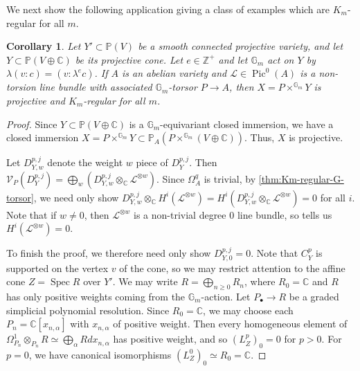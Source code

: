 \documentclass{amsart}
\newtheorem{corollary}[corollary]{Corollary}
\theoremstyle{definition}
\newcommand{\ZZ}{\mathbb{Z}}
\newcommand{\CC}{\mathbb{C}}
\newcommand{\bG}{\mathbb{G}}
\newcommand{\bP}{\mathbb{P}}
\newcommand{\cV}{\mathcal{V}}
\newcommand{\cL}{\mathcal{L}}
\DeclareMathOperator{\Pic}{Pic}
\DeclareMathOperator{\Spec}{Spec}
\begin{document}
We next show the following application giving a class of examples which are $K_m$-regular for all $m$.

\begin{corollary}\label{cor:Km-regular-cone}
    Let $Y'\subset\bP(V)$ be a smooth connected projective variety, and let $Y\subset\bP(V\oplus\CC)$ be its projective cone. Let $e\in\ZZ^+$ and let $\bG_m$ act on $Y$ by $\lambda(v:c)=(v:\lambda^e c)$. If $A$ is an abelian variety and $\cL\in\Pic^0(A)$ is a non-torsion line bundle with associated $\bG_m$-torsor $P\to A$, then $X=P\times^{\bG_m}Y$ is projective and $K_m$-regular for all $m$.
\end{corollary}

\begin{proof}
    Since $Y\subset\bP(V\oplus\CC)$ is a $\bG_m$-equivariant closed immersion, we have a closed immersion $X=P\times^{\bG_m}Y\subset\bP_A(P\times^{\bG_m}(V\oplus\CC))$. Thus, $X$ is projective.

    Let $D^{p,j}_{Y,w}$ denote the weight $w$ piece of $D^{p,j}_Y$. Then $\cV_P(D^{p,j}_Y)=\bigoplus_w(D^{p,j}_{Y,w}\otimes_\CC\cL^{\otimes w})$. Since $\Omega^q_A$ is trivial, by \autoref{thm:Km-regular-G-torsor}, we need only show $D^{p,j}_{Y,w}\otimes_\CC H^i(\cL^{\otimes w})=H^i(D^{p,j}_{Y,w}\otimes_\CC\cL^{\otimes w})=0$ for all $i$. Note that if $w\neq0$, then $\cL^{\otimes w}$ is a non-trivial degree $0$ line bundle, so \cite[p.~76 (vii)]{MumfordAbelianVarieties} tells us $H^i(\cL^{\otimes w})=0$.

    To finish the proof, we therefore need only show $D^{p,j}_{Y,0}=0$. Note that $C^p_Y$ is supported on the vertex $v$ of the cone, so we may restrict attention to the affine cone $Z=\Spec R$ over $Y'$. We may write $R=\bigoplus_{n\geq0}R_n$, where $R_0=\CC$ and $R$ has only positive weights coming from the $\bG_m$-action. Let $P_\bullet\to R$ be a graded simplicial polynomial resolution. Since $R_0=\CC$, we may choose each $P_n=\CC[x_{n,\alpha}]$ with $x_{n,\alpha}$ of positive weight. Then every homogeneous element of $\Omega^1_{P_n}\otimes_{P_n}R\simeq\bigoplus_\alpha R dx_{n,\alpha}$ has positive weight, and so $(L^p_Z)_0=0$ for $p>0$. For $p=0$, we have canonical isomorphisms $(L^0_Z)_0\simeq R_0=\CC$. 


\end{proof}
\end{document}
